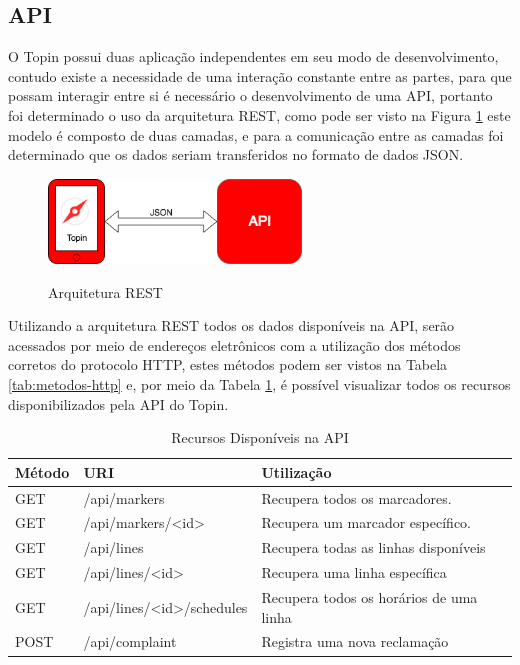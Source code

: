 {{{{\subsection{API}

O Topin possui duas aplicação independentes em seu modo de desenvolvimento, contudo existe a necessidade de uma interação constante entre as partes, para que possam interagir entre si é necessário o desenvolvimento de uma API, portanto foi determinado o uso da arquitetura REST, como pode ser visto na Figura \ref{fig:rest} este modelo é composto de duas camadas, e para a comunicação entre as camadas foi determinado que os dados seriam transferidos no formato de dados JSON.

\begin{figure}[H]
\caption{Arquitetura REST}
\centering
\includegraphics[width=0.6\textwidth]{imagens/rest.png}
\label{fig:rest}
\end{figure}

Utilizando a arquitetura REST todos os dados disponíveis na API, serão acessados por meio de endereços eletrônicos com a utilização dos métodos corretos do protocolo HTTP, estes métodos podem ser vistos na Tabela \ref{tab:metodos-http} e, por meio da Tabela \ref{tab:recursos-disponiveis}, é possível visualizar todos os recursos disponibilizados pela API do Topin.

{\renewcommand{\arraystretch}{2}
\begin{table}[H]
\centering
\caption{Recursos Disponíveis na API}
\label{tab:recursos-disponiveis}
\begin{tabular}{ l | p{6cm} | l }
\hline
\textbf{Método} & \textbf{URI} & \textbf{Utilização} \\
\hline
GET & /api/markers & Recupera todos os marcadores. \\ \hline
GET & /api/markers/<id> & Recupera um marcador específico. \\ \hline
GET & /api/lines & Recupera todas as linhas disponíveis \\ \hline
GET & /api/lines/<id> & Recupera uma linha específica \\ \hline
GET & /api/lines/<id>/schedules & Recupera todos os horários de uma linha \\ \hline
POST & /api/complaint & Registra uma nova reclamação \\ \hline
\end{tabular}
\end{table}

}}}}}

